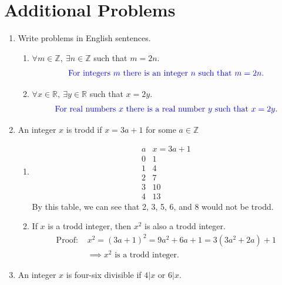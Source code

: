 \documentclass{article}
\begin{document}
\section{Additional Problems}
\begin{enumerate}
    \item Write problems in English sentences.
        \begin{enumerate}[label=\Alph*.]
            \item $\forall m \in \mathbb{Z}, \ \exists n \in \mathbb{Z}$ such that $m = 2n$. 
            \[
            \textcolor{blue}{\text{For integers $m$ there is an integer $n$ such that $m = 2n$.}}
            \]
            \item $\forall x \in \mathbb{R}, \ \exists y \in \mathbb{R}$ such that $x = 2y$.
            \[
            \textcolor{blue}{\text{For real numbers $x$ there is a real number $y$ such that $x = 2y$.}}
            \]
        \end{enumerate}
    \newpage
    \item An integer $x$ is trodd if $x = 3a + 1$ for some $a \in \mathbb{Z}$
        \begin{enumerate}[label=\Alph*.]
            \item
            \[
            \begin{array}{c|c}
                a & x = 3a + 1 \\ \hline
                0 & 1 \\
                1 & 4 \\
                2 & 7 \\
                3 & 10 \\
                4 & 13 
            \end{array}
            \]
            By this table, we can see that 2, 3, 5, 6, and 8 would not be trodd.
            \item If $x$ is a trodd integer, then $x^2$ is also a trodd integer.
            \[
                \begin{aligned}
                    \text{Proof: }&x^2 = (3a + 1)^2 = 9a^2 + 6a + 1 = 3(3a^2 + 2a) + 1 \\
                    &\implies x^2 \text{ is a trodd integer.}
                \end{aligned}
            \]
        \end{enumerate}
    \item An integer $x$ is four-six divisible if $4|x$ or $6|x$.
        \begin{enumerate}[label=\Alph*.]

\end{enumerate}
\end{enumerate}
\end{document}
